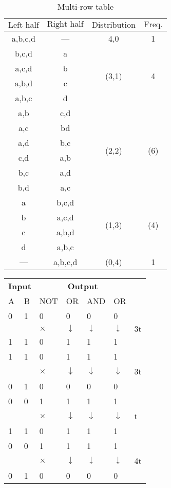 	\begin{table}[ht]
		\caption{Multi-row table}
		\begin{center}
			\begin{tabular}{|c|c|c|c|}
				\hline
				$\text{Left half}$&$\text{Right half}$&$\text{Distribution}$&$\text{Freq.}$\\\hline
				a,b,c,d&---&4,0&1\\\hline
				b,c,d&a&\multirow{4}{*}{(3,1)}&\multirow{4}{*}{4}\\\cline{1-2}
				a,c,d&b & &\\\cline{1-2}
				a,b,d&c& &\\\cline{1-2}
				a,b,c&d& &\\\cline{1-2}\hline
				a,b&c,d&\multirow{6}{*}{(2,2)}&\multirow{6}{*}{(6)}\\\cline{1-2}
				a,c&bd& & \\\cline{1-2}
				a,d& b,c& & \\\cline{1-2}
				c,d&a,b& & \\\cline{1-2}
				b,c& a,d& & \\\cline{1-2}
				b,d&a,c& & \\\cline{1-2}\hline
				a&b,c,d&\multirow{4}{*}{(1,3)}&\multirow{4}{*}{(4)}\\\cline{1-2} 
				b&a,c,d& & \\\cline{1-2}
				c&a,b,d & &\\\cline{1-2}
				d&a,b,c & &\\\hline
				---&a,b,c,d &(0,4) &1 \\\hline
			\end{tabular}
		\end{center}
		\label{tab:multicol}
	\end{table}


	\begin{table}[H]
	\centering
	\renewcommand*{\arraystretch}{1.2}
	\begin{tabular}{|p{1.5cm} p{1.5cm}|p{1.5cm}|p{1.5cm} |p{1.5cm}|p{1.5cm}|p{1.5cm}}
		\cline{1-6}
		\multicolumn{2}{|c|}{\textbf{Input }}&\multicolumn{4}{c|}{\textbf{Output }} & \\\cline{1-6}
		A&B&NOT & OR&AND&OR & \multirow{5}{*}{3t}\\\cline{1-6}
		0&1&0&0 & 0&0&\\
		& &$\times$&$\downarrow$ & $\downarrow$&$\downarrow$&\\ 
		1&1&0&1 & 1&1&\\ \cline{1-6}
		1&1&0&1 & 1&1&\\
		& &$\times$&$\downarrow$ & $\downarrow$&$\downarrow$&3t\\ 
		0&1&0&0 & 0&0&\\ \cline{1-6}
		
		0&0&1&1 & 1&1&\\
		& &$\times$&$\downarrow$ & $\downarrow$&$\downarrow$&t\\ 
		1&1&0&1 & 1&1&\\ \cline{1-6}
		0&0&1&1 & 1&1&\\
		& &$\times$&$\downarrow$ & $\downarrow$&$\downarrow$&4t\\ 
		0&1&0&0 & 0&0&\\ \cline{1-6}
	\end{tabular}
\end{table}